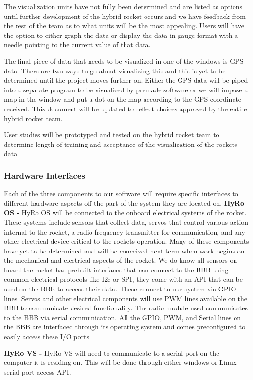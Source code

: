 \documentclass[10pt,draftclsnofoot,onecolumn]{IEEEtran}
\begin{document}
The visualization units have not fully been determined and are listed as options until further development of the hybrid rocket occurs and we have feedback from the rest of the team as to what units will be the most appealing. Users will have the option to either graph the data or display the data in gauge format with a needle pointing to the current value of that data. \par

	The final piece of data that needs to be visualized in one of the windows is GPS data. There are two ways to go about visualizing this and this is yet to be determined until the project moves further on. Either the GPS data will be piped into a separate program to be visualized by premade software or we will impose a map in the window and put a dot on the map according to the GPS coordinate received. This document will be updated to reflect choices approved by the entire hybrid rocket team. \par

	User studies will be prototyped and tested on the hybrid rocket team to determine length of training and acceptance of the visualization of the rockets data. \par

\subsubsection{Hardware Interfaces}
Each of the three components to our software will require specific interfaces to different hardware aspects off the part of the system they are located on. 
{\bf HyRo OS -}
 	HyRo OS will be connected to the onboard electrical systems of the rocket. These systems include sensors that collect data, servos that control various action internal to the rocket, a radio frequency transmitter for communication, and any other electrical device critical to the rockets operation. Many of these components have yet to be determined and will be conceived next term when work begins on the mechanical and electrical aspects of the rocket.  We do know all sensors on board the rocket has prebuilt interfaces that can connect to the BBB using common electrical protocols like I2c or SPI, they come with an API that can be used on the BBB to access their data. These connect to our system via GPIO lines. Servos and other electrical components will use PWM lines available on the BBB to communicate desired functionality. The radio module used communicates to the BBB via serial communication. All the GPIO, PWM, and Serial lines on the BBB are interfaced through its operating system and comes preconfigured to easily access these I/O ports.\par
{\bf HyRo VS -}
HyRo VS will need to communicate to a serial port on the computer it is residing on.  This will be done through either windows or Linux serial port access API.
\end{document}
